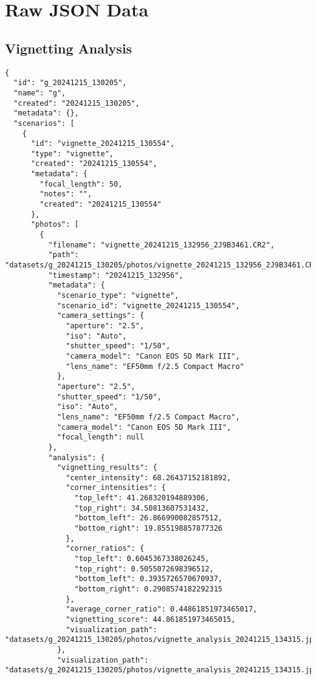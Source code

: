 \appendix

\chapter{Raw JSON Data}

\section{Vignetting Analysis}
\label{app:vignetting_json}
\begin{verbatim}
{
  "id": "g_20241215_130205",
  "name": "g",
  "created": "20241215_130205",
  "metadata": {},
  "scenarios": [
    {
      "id": "vignette_20241215_130554",
      "type": "vignette",
      "created": "20241215_130554",
      "metadata": {
        "focal_length": 50,
        "notes": "",
        "created": "20241215_130554"
      },
      "photos": [
        {
          "filename": "vignette_20241215_132956_2J9B3461.CR2",
          "path": "datasets/g_20241215_130205/photos/vignette_20241215_132956_2J9B3461.CR2",
          "timestamp": "20241215_132956",
          "metadata": {
            "scenario_type": "vignette",
            "scenario_id": "vignette_20241215_130554",
            "camera_settings": {
              "aperture": "2.5",
              "iso": "Auto",
              "shutter_speed": "1/50",
              "camera_model": "Canon EOS 5D Mark III",
              "lens_name": "EF50mm f/2.5 Compact Macro"
            },
            "aperture": "2.5",
            "shutter_speed": "1/50",
            "iso": "Auto",
            "lens_name": "EF50mm f/2.5 Compact Macro",
            "camera_model": "Canon EOS 5D Mark III",
            "focal_length": null
          },
          "analysis": {
            "vignetting_results": {
              "center_intensity": 68.26437152181892,
              "corner_intensities": {
                "top_left": 41.268320194889306,
                "top_right": 34.50813607531432,
                "bottom_left": 26.866990082857512,
                "bottom_right": 19.855198857877326
              },
              "corner_ratios": {
                "top_left": 0.6045367338026245,
                "top_right": 0.5055072698396512,
                "bottom_left": 0.3935726570670937,
                "bottom_right": 0.2908574182292315
              },
              "average_corner_ratio": 0.44861851973465017,
              "vignetting_score": 44.861851973465015,
              "visualization_path": "datasets/g_20241215_130205/photos/vignette_analysis_20241215_134315.jpg"
            },
            "visualization_path": "datasets/g_20241215_130205/photos/vignette_analysis_20241215_134315.jpg",

\end{verbatim}
